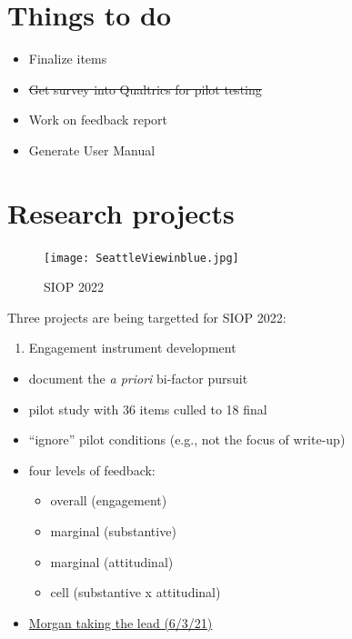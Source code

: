 \documentclass[
]{book}
\providecommand{\tightlist}{%
  \setlength{\itemsep}{0pt}\setlength{\parskip}{0pt}}
\begin{document}
\hypertarget{things-to-do}{%
\section{Things to do}\label{things-to-do}}

\begin{itemize}
\tightlist
\item
  Finalize items
\item
  \sout{Get survey into Qualtrics for pilot testing}
\item
  Work on feedback report
\item
  Generate User Manual
\end{itemize}

\hypertarget{research-projects}{%
\section{Research projects}\label{research-projects}}

\begin{figure}
\centering
\texttt{[image: SeattleViewinblue.jpg]}
\caption{SIOP 2022}
\end{figure}

Three projects are being targetted for SIOP 2022:

\begin{enumerate}
\def\labelenumi{\arabic{enumi}.}
\tightlist
\item
  Engagement instrument development
\end{enumerate}

\begin{itemize}
\tightlist
\item
  document the \emph{a priori} bi-factor pursuit
\item
  pilot study with 36 items culled to 18 final
\item
  ``ignore'' pilot conditions (e.g., not the focus of write-up)
\item
  four levels of feedback:

  \begin{itemize}
  \tightlist
  \item
    overall (engagement)
  \item
    marginal (substantive)
  \item
    marginal (attitudinal)
  \item
    cell (substantive x attitudinal)
  \end{itemize}
\item
  \href{https://github.com/Morgan-Russell/SIOP-Engagement}{Morgan taking the lead (6/3/21)}
\end{itemize}
\end{document}
